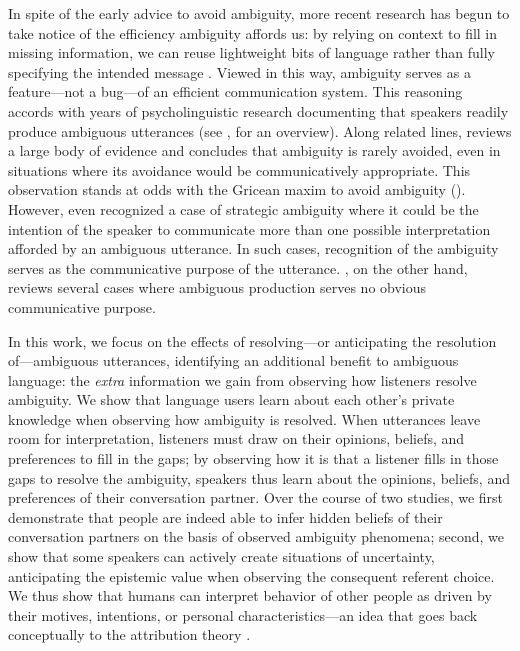 \documentclass[11pt,a4paper]{article}
\begin{document}
In spite of the early advice to avoid ambiguity, more recent research has begun to take notice of the efficiency ambiguity affords us: by relying on context to fill in missing information, we can reuse lightweight bits of language rather than fully specifying the intended message \cite{levinson2000,piantadosietal2012,wasow2015}. 
Viewed in this way, ambiguity serves as a feature---not a bug---of an efficient communication system.
This reasoning accords with years of psycholinguistic research documenting that speakers readily produce ambiguous utterances (see , for an overview). 
Along related lines,  reviews a large body of evidence and concludes that ambiguity is rarely avoided, even in situations where its avoidance would be communicatively appropriate.
This observation stands at odds with the Gricean maxim to avoid ambiguity ().
However, even \citeauthor{grice1975} recognized a case of strategic ambiguity where it could be the intention of the speaker to communicate more than one possible interpretation afforded by an ambiguous utterance. In such cases, recognition of the ambiguity serves as the communicative purpose of the utterance. , on the other hand, reviews several cases where ambiguous production serves no obvious communicative purpose.


In this work, we focus on the effects of resolving---or anticipating the resolution of---ambiguous utterances, identifying an additional benefit to ambiguous language: the \emph{extra} information we gain from observing how listeners resolve ambiguity.
We show that language users learn about each other's private knowledge when observing how ambiguity is resolved. 
When utterances leave room for interpretation, listeners must draw on their opinions, beliefs, and preferences to fill in the gaps;
by observing how it is that a listener fills in those gaps to resolve the ambiguity, speakers thus learn about the opinions, beliefs, and preferences of their conversation partner. 
Over the course of two studies, we first demonstrate that people are indeed able to infer hidden beliefs of their conversation partners on the basis of observed ambiguity phenomena; second, we show that some speakers can actively create situations of uncertainty, anticipating the epistemic value when observing the consequent referent choice. 
We thus show that humans can interpret behavior of other people as driven by their motives, intentions, or personal characteristics---an idea that goes back conceptually to the attribution theory \cite{jones1965acts, kelley1967attribution, kelley1970social}.
\end{document}
